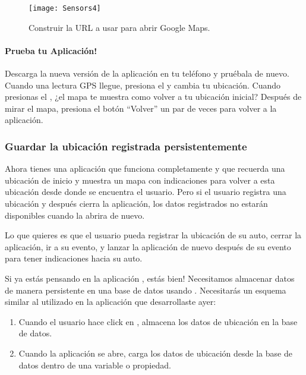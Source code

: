 \begin{figure}[H]
\vspace{3em}
\centering
\texttt{[image: Sensors4]}
\caption{Construir la URL a usar para abrir Google Maps.}
\label{fig:Sensors4}
\end{figure}

\paragraph{Prueba tu Aplicación!} Descarga la nueva versión de la
aplicación en tu teléfono y pruébala de nuevo. Cuando una lectura GPS
llegue, presiona el  y cambia tu
ubicación. Cuando presionas el ,
¿el mapa te muestra como volver a tu ubicación inicial? Después de
mirar el mapa, presiona el botón ``Volver'' un par de veces para
volver a la aplicación.

\subsubsection*{Guardar la ubicación registrada persistentemente}

Ahora tienes una aplicación que funciona completamente y que recuerda
una ubicación de inicio y muestra un mapa con indicaciones para volver
a esta ubicación desde donde se encuentra el usuario. Pero si el
usuario registra una ubicación y después cierra la aplicación, los
datos registrados no estarán disponibles cuando la abrira de nuevo.

Lo que quieres es que el usuario pueda registrar la ubicación de su
auto, cerrar la aplicación, ir a su evento, y lanzar la aplicación de
nuevo después de su evento para tener indicaciones hacia su auto.

Si ya estás pensando en la aplicación , estás bien!
Necesitamos almacenar datos de manera persistente en una base de datos
usando . Necesitarás un esquema similar al utilizado en la
aplicación que desarrollaste ayer:

\begin{enumerate}

\item Cuando el usuario hace click en ,
  almacena los datos de ubicación en la base de datos.

\item Cuando la aplicación se abre, carga los datos de ubicación desde
  la base de datos dentro de una variable o propiedad.
\end{enumerate}

